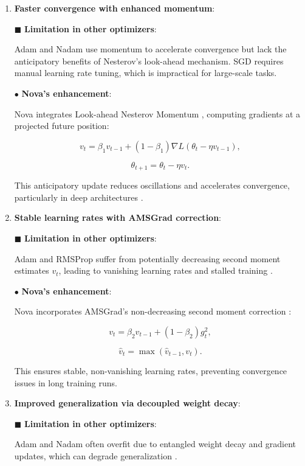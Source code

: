 \documentclass{article}
\begin{document}
\begin{enumerate}


\item  {\bf  Faster convergence with enhanced momentum}:

$\blacksquare$ \textbf{Limitation in other optimizers}:

Adam \cite{kingma2014adam} and Nadam \cite{Dozat2016} use momentum to accelerate convergence but lack the anticipatory benefits of Nesterov’s look-ahead mechanism. SGD requires manual learning rate tuning, which is impractical for large-scale tasks.

$\bullet$ \textbf{Nova’s enhancement}:

Nova integrates Look-ahead Nesterov Momentum \cite{nesterov1983method}, computing gradients at a projected future position:


\[
v_t = \beta_1 v_{t-1} + (1 - \beta_1) \nabla L(\theta_t - \eta v_{t-1}),
\]




\[
\theta_{t+1} = \theta_t - \eta v_t.
\]


This anticipatory update reduces oscillations and accelerates convergence, particularly in deep architectures \cite{Sutskever2013}.

\item{\bf Stable learning rates with AMSGrad correction}:

$\blacksquare$ \textbf{Limitation in other optimizers}:

Adam and RMSProp \cite{Tieleman2012} suffer from potentially decreasing second moment estimates $v_t$, leading to vanishing learning rates and stalled training \cite{Reddi2018}.

$\bullet$ \textbf{Nova’s enhancement}:

Nova incorporates AMSGrad’s non-decreasing second moment correction \cite{Reddi2018}:


\[
v_t = \beta_2 v_{t-1} + (1 - \beta_2) g_t^2,
\]




\[
\hat{v}_t = \max(\hat{v}_{t-1}, v_t).
\]


This ensures stable, non-vanishing learning rates, preventing convergence issues in long training runs.

\item {\bf Improved generalization via decoupled weight decay}:

$\blacksquare$ \textbf{Limitation in other optimizers}:

Adam and Nadam often overfit due to entangled weight decay and gradient updates, which can degrade generalization \cite{Loshchilov2017}.


\end{enumerate}
\end{document}
